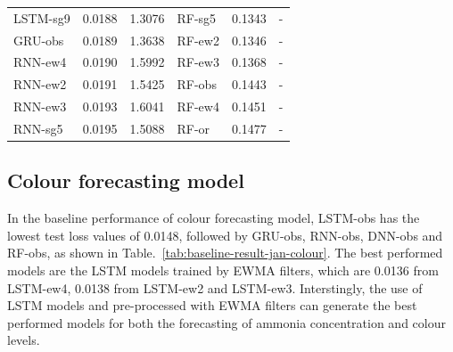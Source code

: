 \begin{table}[!ht]
\begin{NiceTabular}{lcclcc}
        LSTM-sg9 & 0.0188 & 1.3076 & RF-sg5  & 0.1343 & - \\
        GRU-obs  & 0.0189 & 1.3638 & RF-ew2  & 0.1346 & - \\
        RNN-ew4  & 0.0190 & 1.5992 & RF-ew3  & 0.1368 & - \\
        RNN-ew2  & 0.0191 & 1.5425 & RF-obs  & 0.1443 & - \\
        RNN-ew3  & 0.0193 & 1.6041 & RF-ew4  & 0.1451 & - \\
        RNN-sg5  & 0.0195 & 1.5088 & RF-or   & 0.1477 & - \\
        \bottomrule
    \end{NiceTabular}
\end{table}

\subsection{Colour forecasting model}
In the baseline performance of colour forecasting model, LSTM-obs has the lowest test loss values of 0.0148, followed by GRU-obs, RNN-obs, DNN-obs and RF-obs, as shown in Table.~\ref{tab:baseline-result-jan-colour}. The best performed models are the LSTM models trained by EWMA filters, which are 0.0136 from LSTM-ew4, 0.0138 from LSTM-ew2 and LSTM-ew3. Interstingly, the use of LSTM models and pre-processed with EWMA filters can generate the best performed models for both the forecasting of ammonia concentration and colour levels.

